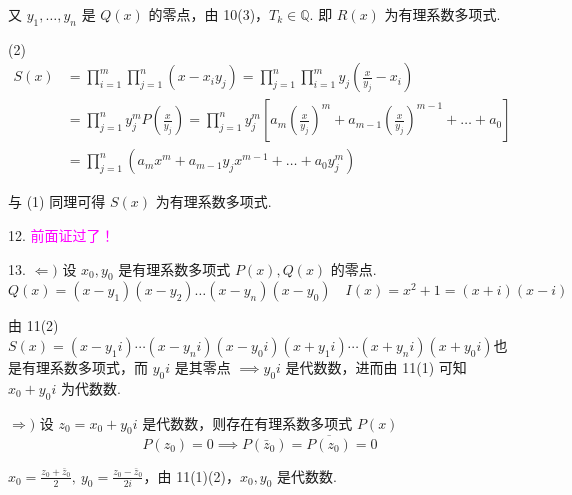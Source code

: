 又 $y_1, \dots, y_n$ 是 $Q(x)$ 的零点，由 10(3)，$T_k \in \mathbb{Q}$. 即 $R(x)$ 为有理系数多项式. 

(2)
\begin{align*}
    S(x) &= \prod_{i=1}^m \prod_{j=1}^n (x - x_i y_j) = \prod_{j=1}^n \prod_{i=1}^m y_j \left(\frac{x}{y_j} - x_i\right) \\
    &= \prod_{j=1}^n y_j^m P\left(\frac{x}{y_j}\right) = \prod_{j=1}^n y_j^m \left[ a_m \left(\frac{x}{y_j}\right)^m + a_{m-1} \left(\frac{x}{y_j}\right)^{m-1} + \dots + a_0 \right] \\
    &= \prod_{j=1}^n ( a_m x^m + a_{m-1} y_j x^{m-1} + \dots + a_0 y_j^m )
\end{align*}

与 (1) 同理可得 $S(x)$ 为有理系数多项式. 

\sepline

12.
\textcolor{magenta}{前面证过了！}

\sepline

13.
$\Leftarrow)$ 设 $x_0, y_0$ 是有理系数多项式 $P(x), Q(x)$ 的零点.$Q(x) = (x-y_1)(x-y_2)\dots(x-y_n)(x-y_0) \quad I(x) = x^2+1 = (x+i)(x-i)$

由 11(2) $S(x) = (x-y_1 i)\cdots(x-y_n i)(x-y_0 i)(x+y_1 i)\cdots(x+y_n i)(x+y_0 i)$也是有理系数多项式，而 $y_0 i$ 是其零点 $\implies y_0 i$ 是代数数，进而由 11(1) 可知 $x_0 + y_0 i$ 为代数数. 

$\Rightarrow)$ 设 $z_0 = x_0 + y_0 i$ 是代数数，则存在有理系数多项式 $P(x)$
$$P(z_0) = 0 \implies P(\bar{z}_0) = \overline{P(z_0)} = 0$$

$x_0 = \frac{z_0 + \bar{z}_0}{2}, \ y_0 = \frac{z_0 - \bar{z}_0}{2i}$，由 11(1)(2)，$x_0, y_0$ 是代数数. 

